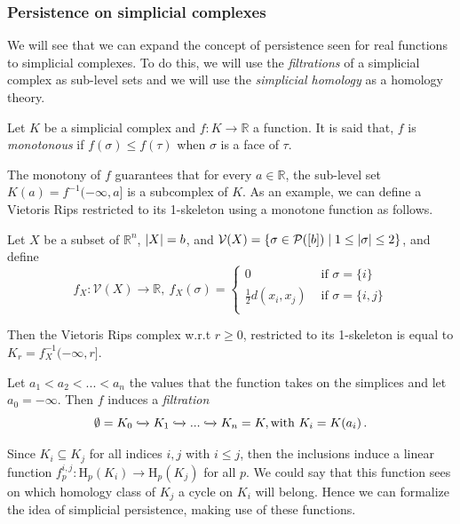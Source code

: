 \documentclass[../main.tex]{subfiles}
\begin{document}
\subsubsection*{Persistence on simplicial complexes}
We will see that we can expand the concept of persistence seen for real functions to simplicial complexes. To do this, we will use the \emph{filtrations} of a simplicial complex as sub-level sets and we will use the \emph{simplicial homology} as a homology theory.

\begin{definition}
Let $K$ be a simplicial complex and $f: K \to \mathbb{R}$ a function. It is said that, $f$ is \emph{monotonous} if $f(\sigma) \leq f(\tau) $ when $\sigma$ is a face of $\tau$.
\end{definition}
\begin{sloppypar}
The monotony of $f$ guarantees that for every $a \in \mathbb {R}$, the sub-level set ${K(a) = f^{-1} (-\infty, a]} $ is a subcomplex of $K$. As an example, we can define a Vietoris Rips restricted to its 1-skeleton using a monotone function as follows.
\end{sloppypar}

\begin{proposition}
Let $X$ be a subset of $\mathbb{R}^n$, $\lvert X\rvert=b$, and $\mathcal{V}(X) = \{\sigma \in \mathcal{P}([b]) \mid 1 \leq \lvert\sigma\rvert \leq 2\}$, and define
\[
f_X: \mathcal{V}(X) \to \mathbb{R},\ f_X(\sigma) = \left\{\begin{matrix}
0 &  \text{ if } \sigma=\{i\}\\
\frac{1}{2}d(x_i, x_j) & \text{ if } \sigma=\{i,j\}\\
\end{matrix}\right. 
\]

Then the Vietoris Rips complex w.r.t $r\geq 0 $, restricted to its 1-skeleton is equal to $K_r=f_X^{-1}(-\infty, r]$.
\end{proposition}


\begin{definition}
Let $a_1 <a_2 <... <a_n$ the values that the function takes on the simplices and let $ a_0 = -\infty$. Then $f$ induces a \emph{filtration}
\[
\emptyset = K_0 \xhookrightarrow{} K_1 \xhookrightarrow{} ... \xhookrightarrow{} K_n = K, \text{with } K_i = K (a_i) \,.
\]
\end{definition}
 
Since $K_i \subseteq K_j$ for all indices $i,j$ with $i \leq j$, then the inclusions induce a linear function $f^{i,j}_p: \text{H}_p(K_i) \to \text{H}_p(K_j)$ for all $p$. We could say that this function sees on which homology class of $K_j$ a cycle on $K_i$ will belong. Hence we can formalize the idea of simplicial persistence, making use of these functions.
\end{document}
